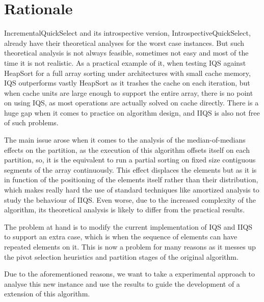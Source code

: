 
\section{Rationale}
IncrementalQuickSelect and its introspective version, IntrospectiveQuickSelect, already have their theoretical analyses for the worst case instances. But such theoretical analysis is not always feasible, sometimes not easy and most of the time it is not realistic. As a practical example of it, when testing IQS against HeapSort for a full array sorting under architectures with small cache memory, IQS outperforms vastly HeapSort as it trashes the cache on each iteration, but when cache units are large enough to support the entire array, there is no point on using IQS, as most operations are actually solved on cache directly. There is a huge gap when it comes to practice on algorithm design, and IIQS is also not free of such problems.

The main issue arose when it comes to the analysis of the median-of-medians effects on the partition, as the execution of this algorithm offsets itself on each partition, so, it is the equivalent to run a partial sorting on fixed size contiguous segments of the array continuously. This effect displaces the elements but as it is in function of the positioning of the elements itself rather than their distribution, which makes really hard the use of standard techniques like amortized analysis to study the behaviour of IIQS. Even worse, due to the increased complexity of the algorithm, its theoretical analysis is likely to differ from the practical results.

The problem at hand is to modify the current implementation of IQS and IIQS to support an extra case, which is when the sequence of elements can have repeated elements on it. This is now a problem for many reasons as it messes up the pivot selection heuristics and partition stages of the original algorithm.

Due to the aforementioned reasons, we want to take a experimental approach to analyse this new instance and use the results to guide the development of a extension of this algorithm.